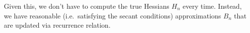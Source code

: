 \documentclass[12pt]{book}
\numberwithin{equation}{section} %
\theoremstyle{plain}
\theoremstyle{definition}
\theoremstyle{remark}
\begin{document}
Given this, we don't have to compute the true Hessians $H_n$ every time.
Instead, we have reasonable (i.e.\ satisfying the secant conditions)
approximations $B_n$ that are updated via recurrence relation.








\end{document}
